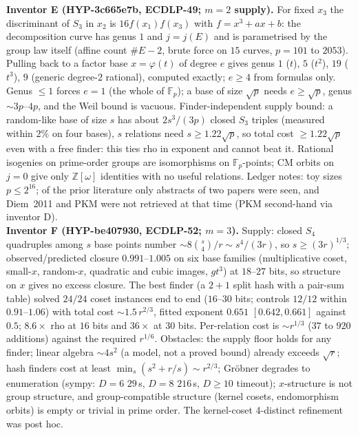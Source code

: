 \documentclass[11pt,a4paper]{article}
\theoremstyle{remark}
\newcommand{\F}{\mathbb{F}}
\begin{document}
\textbf{Inventor E (\mbox{HYP-3c665e7b}, ECDLP-49; $m=2$ supply).} For fixed $x_3$ the discriminant of $S_3$ in $x_2$ is $16f(x_1)f(x_3)$ with $f=x^3+ax+b$: the decomposition curve has genus $1$ and $j=j(E)$ and is parametrised by the group law itself (affine count $\#E-2$, brute force on $15$ curves, $p=101$ to $2053$). Pulling back to a factor base $x=\varphi(t)$ of degree $e$ gives genus $1$ ($t$), $5$ ($t^2$), $19$ ($t^3$), $9$ (generic degree-$2$ rational), computed exactly; $e\ge4$ from formulas only. Genus $\le1$ forces $e=1$ (the whole of $\F_p$); a base of size $\sqrt p$ needs $e\ge\sqrt p$, genus $\sim3p$--$4p$, and the Weil bound is vacuous. Finder-independent supply bound: a random-like base of size $s$ has about $2s^3/(3p)$ closed $S_3$ triples (measured within $2\%$ on four bases), $s$ relations need $s\ge1.22\sqrt p$, so total cost $\ge1.22\sqrt p$ even with a free finder: this ties rho in exponent and cannot beat it. Rational isogenies on prime-order groups are isomorphisms on $\F_p$-points; CM orbits on $j=0$ give only $\mathbb Z[\omega]$ identities with no useful relations. Ledger notes: toy sizes $p\le2^{16}$; of the prior literature only abstracts of two papers were seen, and Diem~2011 and PKM were not retrieved at that time (PKM second-hand via inventor D).\\
\textbf{Inventor F (\mbox{HYP-be407930}, ECDLP-52; $m=3$).} Supply: closed $S_4$ quadruples among $s$ base points number $\sim 8\binom s4/r\sim s^4/(3r)$, so $s\ge(3r)^{1/3}$; observed/predicted closure $0.991$--$1.005$ on six base families (multiplicative coset, small-$x$, random-$x$, quadratic and cubic images, $gt^3$) at $18$--$27$ bits, so structure on $x$ gives no excess closure. The best finder (a $2{+}1$ split hash with a pair-sum table) solved $24/24$ coset instances end to end ($16$--$30$ bits; controls $12/12$ within $0.91$--$1.06$) with total cost $\sim1.5\,r^{2/3}$, fitted exponent $0.651$ $[0.642,0.661]$ against $0.5$; $8.6\times$ rho at $16$ bits and $36\times$ at $30$ bits. Per-relation cost is $\sim r^{1/3}$ ($37$ to $920$ additions) against the required $r^{1/6}$. Obstacles: the supply floor holds for any finder; linear algebra $\sim4s^2$ (a model, not a proved bound) already exceeds $\sqrt r$; hash finders cost at least $\min_s(s^2+r/s)\sim r^{2/3}$; Gr\"obner degrades to enumeration (sympy: $D=6$ $29$\,s, $D=8$ $216$\,s, $D\ge10$ timeout); $x$-structure is not group structure, and group-compatible structure (kernel cosets, endomorphism orbits) is empty or trivial in prime order. The kernel-coset 4-distinct refinement was post hoc.\\
\end{document}
